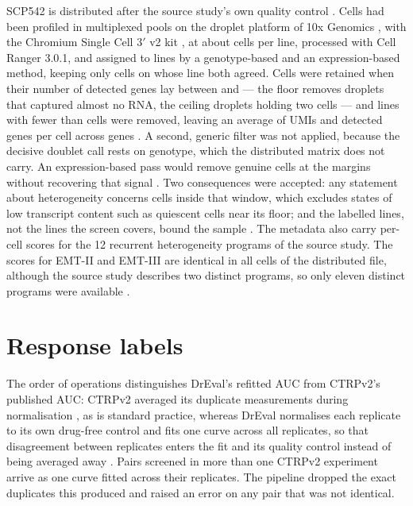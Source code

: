 SCP542 is distributed after the source study's own quality control \cite{scp542}. Cells had been
profiled in \NPools{} multiplexed pools on the droplet platform of 10x Genomics \cite{zheng2017},
with the Chromium Single Cell 3$'$ v2 kit \cite{scp542}, at about \SrcCellsPerLine{} cells per line, processed with Cell Ranger 3.0.1, and assigned
to lines by a genotype-based and an expression-based method, keeping only cells on whose line both agreed. Cells were retained when
their number of detected genes lay between \QcGenesLo{} and \QcGenesHi{} --- the floor removes droplets that
captured almost no RNA, the ceiling droplets holding two cells --- and lines with fewer than \QcMinCells{} cells
were removed, leaving an average of \SrcUmiMean{} UMIs and \SrcGenesMean{} detected
genes per cell across \NGenes{} genes \cite{scp542,luecken2019}. A second, generic filter was not
applied, because the decisive doublet call rests on genotype, which the distributed matrix does not
carry. An expression-based pass would remove genuine cells at the margins without recovering that
signal \cite{scp542,luecken2019}. Two consequences were accepted: any statement about heterogeneity
concerns cells inside that window, which excludes states of low transcript content such as quiescent
cells near its floor; and the \NLines{} labelled lines, not the \NCtrpLines{} lines the screen covers,
bound the sample \cite{scp542,dreval}. The metadata also carry per-cell scores for the 12 recurrent
heterogeneity programs of the source study. The scores for EMT-II and EMT-III are identical in all
\NCells{} cells of the distributed file, although the source study describes two distinct programs, so
only eleven distinct programs were available \cite{scp542,scp542_portal}.

\section{Response labels}
\label{app:labels}

The order of operations distinguishes DrEval's refitted AUC from CTRPv2's published AUC: CTRPv2
averaged its duplicate measurements during normalisation \cite{ctrpv2}, as is standard practice, whereas
DrEval normalises each replicate to its own drug-free control and fits one curve across all replicates,
so that disagreement between replicates enters the fit and its quality control instead of being averaged
away \cite{dreval,bayer2023curvecurator}. Pairs screened in more than one CTRPv2 experiment arrive as one
curve fitted across their replicates. The pipeline dropped the exact duplicates this produced and raised
an error on any pair that was not identical.


